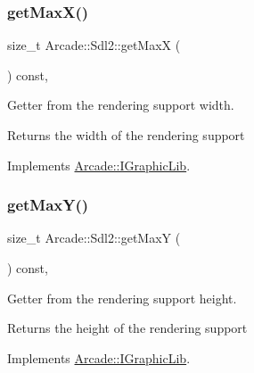 \subsubsection{\texorpdfstring{get\+Max\+X()}{getMaxX()}}
{\footnotesize\ttfamily size\+\_\+t Arcade\+::\+Sdl2\+::get\+MaxX (\begin{DoxyParamCaption}{ }\end{DoxyParamCaption}) const\hspace{0.3cm}{\ttfamily [final]}, {\ttfamily [virtual]}}



Getter from the rendering support width. 

\begin{DoxyReturn}{Returns}
the width of the rendering support 
\end{DoxyReturn}


Implements \hyperlink{class_arcade_1_1_i_graphic_lib_a41a3c00970ecd16e1893105de2091a55}{Arcade\+::\+I\+Graphic\+Lib}.

\mbox{\label{class_arcade_1_1_sdl2_a958b3611cb0f7db90eeca5c9c4eaed59}} 
\subsubsection{\texorpdfstring{get\+Max\+Y()}{getMaxY()}}
{\footnotesize\ttfamily size\+\_\+t Arcade\+::\+Sdl2\+::get\+MaxY (\begin{DoxyParamCaption}{ }\end{DoxyParamCaption}) const\hspace{0.3cm}{\ttfamily [final]}, {\ttfamily [virtual]}}



Getter from the rendering support height. 

\begin{DoxyReturn}{Returns}
the height of the rendering support 
\end{DoxyReturn}


Implements \hyperlink{class_arcade_1_1_i_graphic_lib_ae8701e702b51189c84b1900dd624912e}{Arcade\+::\+I\+Graphic\+Lib}.

\mbox{\label{class_arcade_1_1_sdl2_aa1d9e278616747b87d868fadb0272d43}} 
